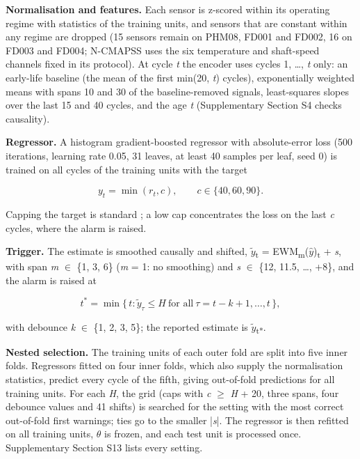 \documentclass[a4paper,fleqn,doubleblind]{cas-dc}
\begin{document}
\textbf{Normalisation and features.} Each sensor is z-scored within its operating regime with statistics of the training units, and sensors that are constant within any regime are dropped (15 sensors remain on PHM08, FD001 and FD002, 16 on FD003 and FD004; N-CMAPSS uses the six temperature and shaft-speed channels fixed in its protocol). At cycle \textit{t} the encoder uses cycles 1, \ldots{}, \textit{t} only: an early-life baseline (the mean of the first min(20, \textit{t}) cycles), exponentially weighted means with spans 10 and 30 of the baseline-removed signals, least-squares slopes over the last 15 and 40 cycles, and the age \textit{t} (Supplementary Section S4 checks causality).

\textbf{Regressor.} A histogram gradient-boosted regressor \cite{pedregosa2011} with absolute-error loss (500 iterations, learning rate 0.05, 31 leaves, at least 40 samples per leaf, seed 0) is trained on all cycles of the training units with the target

\begin{equation}
y_t = \min( r_t, c ), \qquad c \in \{40, 60, 90\}.
\end{equation}

Capping the target is standard \cite{heimes2008}; a low cap concentrates the loss on the last \textit{c} cycles, where the alarm is raised.

\textbf{Trigger.} The estimate is smoothed causally and shifted, $\tilde{y}$\textsubscript{t} = EWM\textsubscript{m}($\hat{y}$)\textsubscript{t} + \textit{s}, with span \textit{m} $\in$ \{1, 3, 6\} (\textit{m} = 1: no smoothing) and \textit{s} $\in$ \{\textminus{}12, \textminus{}11.5, \ldots{}, +8\}, and the alarm is raised at

\begin{equation}
t^{*} = \min\{\, t : \tilde{y}_{\tau} \le H \ \text{for all}\ \tau = t-k+1, \ldots, t \,\},
\end{equation}

with debounce \textit{k} $\in$ \{1, 2, 3, 5\}; the reported estimate is $\tilde{y}$\textsubscript{t*}.

\textbf{Nested selection.} The training units of each outer fold are split into five inner folds. Regressors fitted on four inner folds, which also supply the normalisation statistics, predict every cycle of the fifth, giving out-of-fold predictions for all training units. For each \textit{H}, the grid (caps with \textit{c} $\ge$ \textit{H} + 20, three spans, four debounce values and 41 shifts) is searched for the setting with the most correct out-of-fold first warnings; ties go to the smaller |\textit{s}|. The regressor is then refitted on all training units, $\theta$ is frozen, and each test unit is processed once. Supplementary Section S13 lists every setting.
\end{document}

